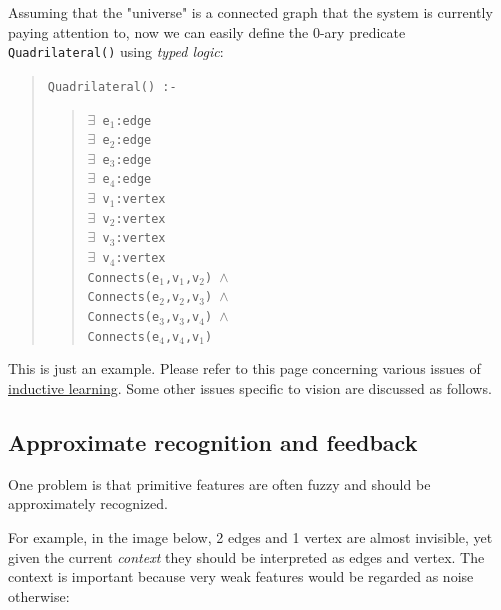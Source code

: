 Assuming that the "universe"  is a connected graph that the system is currently paying attention to, now we can easily define the 0-ary predicate \texttt{Quadrilateral()} using \emph{typed logic}:
\begin{quote}

\texttt{Quadrilateral() :-}
\begin{quote}

\texttt{$\exists $ e$_1$:edge
\\
      $\exists $ e$_2$:edge
\\
      $\exists $ e$_3$:edge
\\
      $\exists $ e$_4$:edge
\\
      $\exists $ v$_1$:vertex
\\
      $\exists $ v$_2$:vertex
\\
      $\exists $ v$_3$:vertex
\\
      $\exists $ v$_4$:vertex
\\
      Connects(e$_1$,v$_1$,v$_2$) $\wedge$
\\
      Connects(e$_2$,v$_2$,v$_3$) $\wedge$
\\
      Connects(e$_3$,v$_3$,v$_4$) $\wedge$
\\
    Connects(e$_4$,v$_4$,v$_1$)}
\end{quote}
\end{quote}

This is just an example. Please refer to this page concerning  various issues of \href{Vis-InductiveLearning.htm}{inductive learning}. Some other issues specific to vision are discussed as follows.

\subsection{Approximate recognition and feedback}

One problem is that primitive features  are often fuzzy and should be approximately recognized.

For example, in the image below, 2 edges and 1 vertex are almost invisible, yet given the current \emph{context} they should be interpreted as edges and vertex. The context is important because very weak features would be regarded as noise otherwise:

